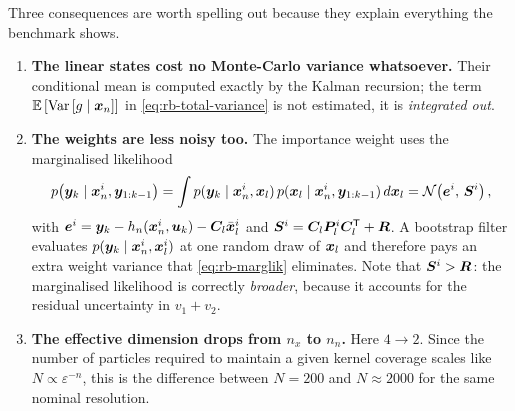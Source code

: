 Three consequences are worth spelling out because they explain everything the benchmark shows.
\begin{enumerate}[leftmargin=2em]
  \item \textbf{The linear states cost no Monte-Carlo variance whatsoever.}  Their conditional mean
        is computed exactly by the Kalman recursion; the term $\mathbb{E}\left[\operatorname{Var}\left[g\mid\bm{x}_n\right]\right]$ in
        \eqref{eq:rb-total-variance} is not estimated, it is \emph{integrated out}.
  \item \textbf{The weights are less noisy too.}  The importance weight uses the marginalised
        likelihood
        \begin{equation}
          p\big(\bm{y}_k \mid \bm{x}_n^i, \bm{y}_{1:k-1}\big)
          = \int p(\bm{y}_k\mid\bm{x}_n^i,\bm{x}_l)\,p(\bm{x}_l\mid\bm{x}_n^i,\bm{y}_{1:k-1})\,d\bm{x}_l
          = \mathcal{N}\!\left(\bm{e}^i,\,\bm{S}^i\right),
          \label{eq:rb-marglik}
        \end{equation}
        with $\bm e^i = \bm{y}_k - h_n(\bm{x}_n^i,\bm{u}_k) - \bm{C}_l\bar{\bm{x}}_l^i$ and
        $\bm{S}^i = \bm{C}_l\bm{P}_l^i\bm{C}_l^{\mathsf{T}} + \bm{R}$.  A bootstrap filter evaluates
        $p(\bm{y}_k\mid\bm{x}_n^i,\bm{x}_l^i)$ at one random draw of $\bm{x}_l$ and therefore pays an extra
        weight variance that \eqref{eq:rb-marglik} eliminates.  Note that $\bm{S}^i > \bm{R}$: the
        marginalised likelihood is correctly \emph{broader}, because it accounts for the residual
        uncertainty in $v_1+v_2$.
  \item \textbf{The effective dimension drops from $n_x$ to $n_n$.}  Here $4\to2$.  Since the
        number of particles required to maintain a given kernel coverage scales like
        $N \propto \varepsilon^{-n}$, this is the difference between $N=200$ and $N\approx 2000$
        for the same nominal resolution.
\end{enumerate}

